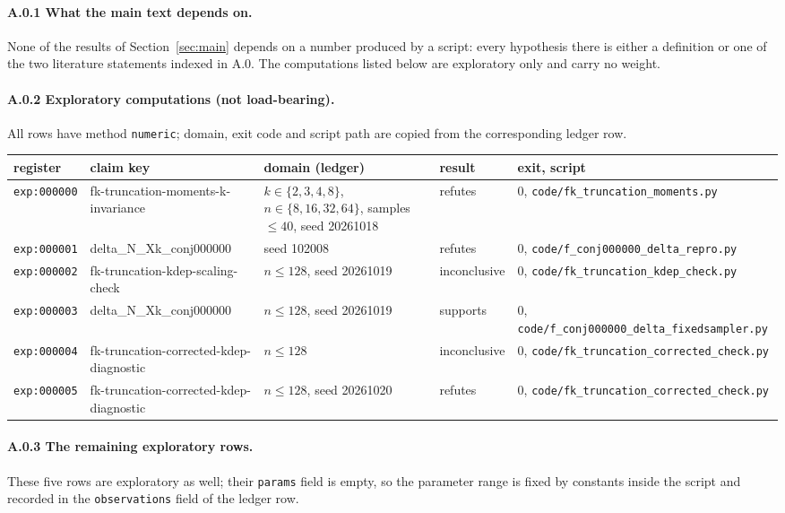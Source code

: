 \documentclass[11pt]{article}
\theoremstyle{plain}
\theoremstyle{definition}
\theoremstyle{remark}
\begin{document}
\paragraph{A.0.1 What the main text depends on.} None of the results of Section~\ref{sec:main} depends on a number produced by a script: every hypothesis there is either a definition or one of the two literature statements indexed in A.0. The computations listed below are exploratory only and carry no weight.

\paragraph{A.0.2 Exploratory computations (not load-bearing).} All rows have method \texttt{numeric}; domain, exit code and script path are copied from the corresponding ledger row.

\begin{center}\small
\begin{tabular}{@{}llp{4.4cm}ll@{}}
\hline
register & claim key & domain (ledger) & result & exit, script \\
\hline
\texttt{exp:000000} & fk-truncation-moments-k-invariance & $k\in\{2,3,4,8\}$, $n\in\{8,16,32,64\}$, samples$\le40$, seed 20261018 & refutes & 0, \texttt{code/fk\_truncation\_moments.py} \\
\texttt{exp:000001} & delta\_N\_Xk\_conj000000 & seed 102008 & refutes & 0, \texttt{code/f\_conj000000\_delta\_repro.py} \\
\texttt{exp:000002} & fk-truncation-kdep-scaling-check & $n\le128$, seed 20261019 & inconclusive & 0, \texttt{code/fk\_truncation\_kdep\_check.py} \\
\texttt{exp:000003} & delta\_N\_Xk\_conj000000 & $n\le128$, seed 20261019 & supports & 0, \texttt{code/f\_conj000000\_delta\_fixedsampler.py} \\
\texttt{exp:000004} & fk-truncation-corrected-kdep-diagnostic & $n\le128$ & inconclusive & 0, \texttt{code/fk\_truncation\_corrected\_check.py} \\
\texttt{exp:000005} & fk-truncation-corrected-kdep-diagnostic & $n\le128$, seed 20261020 & refutes & 0, \texttt{code/fk\_truncation\_corrected\_check.py} \\
\hline
\end{tabular}
\end{center}

\paragraph{A.0.3 The remaining exploratory rows.} These five rows are exploratory as well; their \texttt{params} field is empty, so the parameter range is fixed by constants inside the script and recorded in the \texttt{observations} field of the ledger row.
\end{document}
